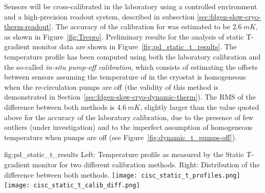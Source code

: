 Sensors will be cross-calibrated in the laboratory using a controlled environment and a high-precision readout system, described in subsection \ref{sec:fdgen-slow-cryo-therm-readout}.
The accuracy of the calibration for  was estimated to be $\SI{2.6}{mK}$, as shown in Figure~\ref{fig:Trepro}. Preliminary results for the analysis of  static T-gradient monitor data are shown in Figure~\ref{fig:pd_static_t_results}. The temperature profile has been computed using both the laboratory calibration and the so-called \textit{in-situ pump-off calibration}, which consists %
of estimating the offsets between sensors assuming the temperature of \lar in the cryostat is homogeneous when the re-circulation pumps are off (the validity of this method is demonstrated in Section~\ref{sec:fdgen-slow-cryo-dynamic-therm}).  
The RMS of the difference between both methods is $\SI{4.6}{mK}$, slightly larger than the value quoted above for the accuracy of the laboratory calibration, due to the presence of few outliers (under investigation) and to the imperfect assumption of homogeneous temperature when pumps are off (see Figure~\ref{fig:dynamic_t_pumps-off}).  

\begin{dunefigure}{fig:pd_static_t_results}{
 Left: Temperature profile as measured by the Static T-gradient monitor for two different calibration methods. Right: Distribution of the difference between both methods.}
  \texttt{[image: cisc\_static\_t\_profiles.png]}%
  \texttt{[image: cisc\_static\_t\_calib\_diff.png]}%
\end{dunefigure}


